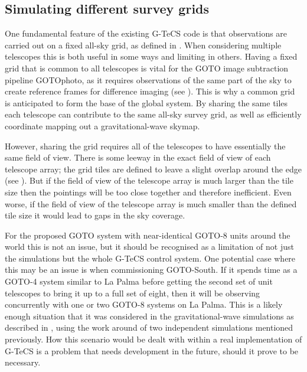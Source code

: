 \subsection{Simulating different survey grids}
\label{sec:multi_grid_scheduling}
\begin{colsection}

One fundamental feature of the existing G-TeCS code is that observations are carried out on a fixed all-sky grid, as defined in . When considering multiple telescopes this is both useful in some ways and limiting in others. Having a fixed grid that is common to all telescopes is vital for the GOTO image subtraction pipeline GOTOphoto, as it requires observations of the same part of the sky to create reference frames for difference imaging (see ). This is why a common grid is anticipated to form the base of the global system. By sharing the same tiles each telescope can contribute to the same all-sky survey grid, as well as efficiently coordinate mapping out a gravitational-wave skymap.

\newpage

However, sharing the grid requires all of the telescopes to have essentially the same field of view. There is some leeway in the exact field of view of each telescope array; the grid tiles are defined to leave a slight overlap around the edge (see ). But if the field of view of the telescope array is much larger than the tile size then the pointings will be too close together and therefore inefficient. Even worse, if the field of view of the telescope array is much smaller than the defined tile size it would lead to gaps in the sky coverage.

For the proposed GOTO system with near-identical GOTO-8 units around the world this is not an issue, but it should be recognised as a limitation of not just the simulations but the whole G-TeCS control system. One potential case where this may be an issue is when commissioning GOTO-South. If it spends time as a GOTO-4 system similar to La Palma before getting the second set of unit telescopes to bring it up to a full set of eight, then it will be observing concurrently with one or two GOTO-8 systems on La Palma. This is a likely enough situation that it was considered in the gravitational-wave simulations as described in , using the work around of two independent simulations mentioned previously. How this scenario would be dealt with within a real implementation of G-TeCS is a problem that needs development in the future, should it prove to be necessary.

\end{colsection}

